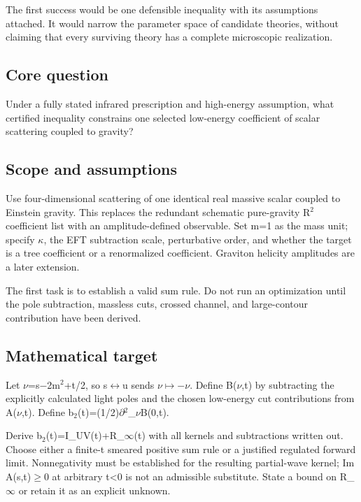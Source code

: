 \documentclass[
  11pt,
]{article}
\begin{document}
The first success would be one defensible inequality with its
assumptions attached. It would narrow the parameter space of candidate
theories, without claiming that every surviving theory has a complete
microscopic realization.

\subsection{Core question}

Under a fully stated infrared prescription and high-energy assumption,
what certified inequality constrains one selected low-energy coefficient
of scalar scattering coupled to gravity?

\subsection{Scope and assumptions}

Use four-dimensional scattering of one identical real massive scalar
coupled to Einstein gravity. This replaces the redundant schematic
pure-gravity R\ensuremath{{}^{2}} coefficient list with an
amplitude-defined observable. Set m=1 as the mass unit; specify
\ensuremath{\kappa}, the EFT subtraction scale, perturbative order, and
whether the target is a tree coefficient or a renormalized coefficient.
Graviton helicity amplitudes are a later extension.

The first task is to establish a valid sum rule. Do not run an
optimization until the pole subtraction, massless cuts, crossed channel,
and large-contour contribution have been derived.

\subsection{Mathematical target}

Let \ensuremath{\nu}=s\ensuremath{-}2m\ensuremath{{}^{2}}+t/2, so
s\ensuremath{\leftrightarrow}u sends
\ensuremath{\nu}\ensuremath{\mapsto}\ensuremath{-}\ensuremath{\nu}.
Define B(\ensuremath{\nu},t) by subtracting the explicitly calculated
light poles and the chosen low-energy cut contributions from
A(\ensuremath{\nu},t). Define
b\ensuremath{{}_{2}}(t)=(1/2)\ensuremath{\partial}\ensuremath{{}^{2}}\_\ensuremath{\nu}B(0,t).

Derive b\ensuremath{{}_{2}}(t)=I\_UV(t)+R\_\ensuremath{\infty}(t) with
all kernels and subtractions written out. Choose either a finite-t
smeared positive sum rule or a justified regulated forward limit.
Nonnegativity must be established for the resulting partial-wave kernel;
Im A(s,t)\ensuremath{\ge}0 at arbitrary t\textless0 is not an admissible
substitute. State a bound on R\_\ensuremath{\infty} or retain it as an
explicit unknown.
\end{document}
